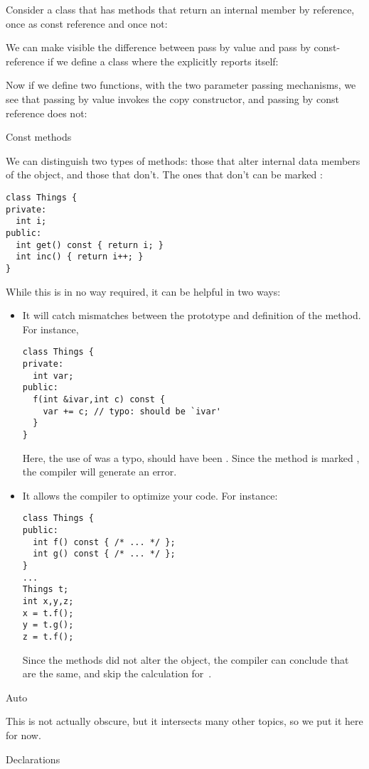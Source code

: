 Consider a class that has methods that return an internal member by
reference, once as const reference and once not:
%

We can make visible the difference between pass by value and pass by
const-reference if we define a class where the
 explicitly reports itself:
%
  
Now if we define two functions, with the two parameter passing
mechanisms, we see that passing by value invokes the copy constructor,
and passing by const reference does not:
%

 {Const methods}

We can distinguish two types of methods: those that alter internal
data members of the object, and those that don't. The ones that don't
can be marked :
\begin{verbatim}
class Things {
private:
  int i;
public:
  int get() const { return i; }
  int inc() { return i++; }
}
\end{verbatim}
While this is in no way required, it can be helpful in two ways:
\begin{itemize}
\item It will catch mismatches between the prototype and definition of
  the method. For instance,
\begin{verbatim}
class Things {
private:
  int var;
public:
  f(int &ivar,int c) const {
    var += c; // typo: should be `ivar'
  }
}
\end{verbatim}
Here, the use of  was a typo, should have been . Since
the method is marked , the compiler will generate an error.
\item It allows the compiler to optimize your code. For instance:
\begin{verbatim}
class Things {
public:
  int f() const { /* ... */ };
  int g() const { /* ... */ };
}
...
Things t;
int x,y,z;
x = t.f();
y = t.g();
z = t.f();
\end{verbatim}
Since the methods did not alter the object, the compiler can conclude
that  are the same, and skip the calculation for~.
\end{itemize}

 {Auto}

This is not actually obscure, but it intersects many other topics, so
we put it here for now.

 {Declarations}

